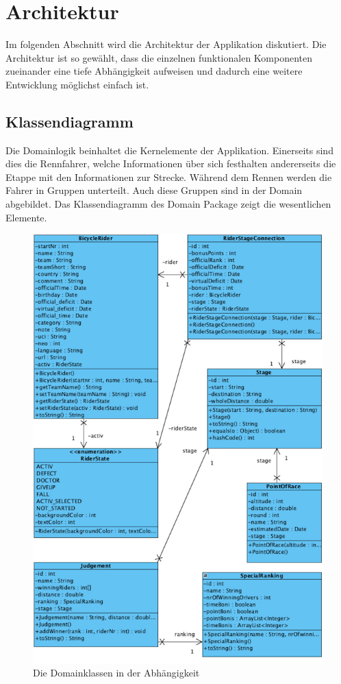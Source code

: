 \chapter{Architektur}
Im folgenden Abschnitt wird die Architektur der Applikation diskutiert. Die Architektur ist so gewählt, dass die einzelnen funktionalen Komponenten zueinander eine tiefe Abhängigkeit aufweisen und dadurch eine weitere Entwicklung möglichst einfach ist.

\section{Klassendiagramm}
Die Domainlogik beinhaltet die Kernelemente der Applikation. Einerseits sind dies die Rennfahrer, welche Informationen über sich festhalten andererseits die Etappe mit den Informationen zur Strecke. Während dem Rennen werden die Fahrer in Gruppen unterteilt. Auch diese Gruppen sind in der Domain abgebildet. Das Klassendiagramm des Domain Package zeigt die wesentlichen Elemente.

\begin{figure}[h!]
\caption{Die Domainklassen in der Abhängigkeit}
\label{fig:domain}
\centering
\includegraphics{05bericht/images/domain.png}
\end{figure} 


